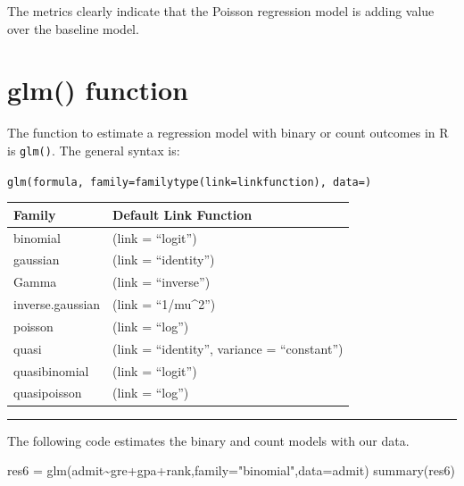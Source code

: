 \documentclass[
]{article}
\newenvironment{Shaded}{\begin{snugshade}}{\end{snugshade}}
\newcommand{\AttributeTok}[1]{\textcolor[rgb]{0.77,0.63,0.00}{#1}}
\newcommand{\FunctionTok}[1]{\textcolor[rgb]{0.00,0.00,0.00}{#1}}
\newcommand{\NormalTok}[1]{#1}
\newcommand{\OtherTok}[1]{\textcolor[rgb]{0.56,0.35,0.01}{#1}}
\newcommand{\SpecialCharTok}[1]{\textcolor[rgb]{0.00,0.00,0.00}{#1}}
\newcommand{\StringTok}[1]{\textcolor[rgb]{0.31,0.60,0.02}{#1}}
\begin{document}
The metrics clearly indicate that the Poisson regression model is adding
value over the baseline model.

\hypertarget{glm-function}{%
\section{glm() function}\label{glm-function}}

The function to estimate a regression model with binary or count
outcomes in R is \texttt{glm()}. The general syntax is:

\texttt{glm(formula,\ family=familytype(link=linkfunction),\ data=)}

\begin{longtable}[]{@{}ll@{}}
\toprule()
Family & Default Link Function \\
\midrule()
\endhead
binomial & (link = ``logit'') \\
gaussian & (link = ``identity'') \\
Gamma & (link = ``inverse'') \\
inverse.gaussian & (link = ``1/mu\^{}2'') \\
poisson & (link = ``log'') \\
quasi & (link = ``identity'', variance = ``constant'') \\
quasibinomial & (link = ``logit'') \\
quasipoisson & (link = ``log'') \\
\bottomrule()
\end{longtable}

\begin{center}\rule{0.5\linewidth}{0.5pt}\end{center}

The following code estimates the binary and count models with our data.

\begin{Shaded}
\begin{Highlighting}[]
\NormalTok{res6 }\OtherTok{=} \FunctionTok{glm}\NormalTok{(admit}\SpecialCharTok{\textasciitilde{}}\NormalTok{gre}\SpecialCharTok{+}\NormalTok{gpa}\SpecialCharTok{+}\NormalTok{rank,}\AttributeTok{family=}\StringTok{"binomial"}\NormalTok{,}\AttributeTok{data=}\NormalTok{admit)}
\FunctionTok{summary}\NormalTok{(res6)}
\end{Highlighting}
\end{Shaded}
\end{document}
